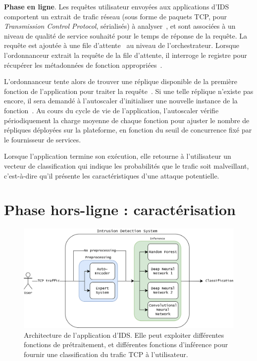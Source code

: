 \textbf{Phase en ligne}. Les requêtes utilisateur envoyées aux applications d'\gls{IDS} comportent un extrait de trafic réseau (sous forme de paquets \gls{TCP}, pour \textit{Transmission Control Protocol}, sérialisés) à analyser~, et sont associées à un niveau de qualité de service souhaité pour le temps de réponse de la requête. La requête est ajoutée à une file d'attente~ au niveau de l'orchestrateur. Lorsque l'ordonnanceur extrait la requête de la file d'attente, il interroge le registre pour récupérer les métadonnées de fonction appropriées~.

L'ordonnanceur tente alors de trouver une réplique disponible de la première fonction de l'application pour traiter la requête~. Si une telle réplique n'existe pas encore, il sera demandé à l'autoscaler d'initialiser une nouvelle instance de la fonction~. Au cours du cycle de vie de l'application, l'autoscaler vérifie périodiquement la charge moyenne de chaque fonction pour ajuster le nombre de répliques déployées sur la plateforme, en fonction du seuil de concurrence fixé par le fournisseur de services.

Lorsque l'application termine son exécution, elle retourne à l'utilisateur un vecteur de classification qui indique les probabilités que le trafic soit malveillant, c'est-à-dire qu'il présente les caractéristiques d'une attaque potentielle.

\section{Phase hors-ligne : caractérisation} 
\label{section:herocache-workload}

\begin{figure}[!ht]
    \centering
    \includegraphics[width=0.8\columnwidth]{5_Chapitre5/figures/ids-application.png}
    \caption{Architecture de l'application d'IDS. Elle peut exploiter différentes fonctions de prétraitement, et différentes fonctions d'inférence pour fournir une classification du trafic \gls{TCP} à l'utilisateur.}
    \label{figure:herocache-ids-application}
\end{figure}

